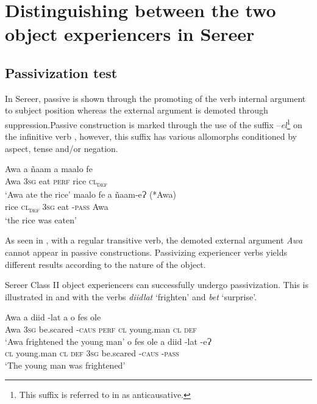 \documentclass[output=paper]{langscibook}
\begin{document}
\section{Distinguishing between the two object  experiencers in Sereer}
\label{sec:tamba:3}
\subsection{Passivization test}
\label{sec:tamba:3.1}

In Sereer, passive is shown through the promoting of the verb internal argument to subject position whereas the external argument is demoted through suppression.Passive construction is marked through the use of the suffix –\textit{el}\footnote{This suffix is referred to in \citet{FayeMous2006} as anticausative.} on the infinitive verb \citep{Faye1979,Renaudier2012,Faye2013}, however, this suffix has various allomorphs conditioned by aspect, tense and/or negation.

\ea \label{ex:tamba:8}
\ea \label{ex:tamba:8a}
\gll Awa   a       ñaam   a         maalo fe\\
Awa   \textsc{3sg}   eat      \textsc{perf}    rice     \textsc{cl\textsubscript{def}}\\
\glt `Awa ate the rice'
\ex \label{ex:tamba:8b}
\gll maalo fe     a      ñaam-eɁ       (*Awa)\\
rice    \textsc{cl\textsubscript{def}} \textsc{3sg}  eat     {}-\textsc{pass}   Awa\\
\glt `the rice was eaten'
\z
\z

As seen in , with a regular transitive verb, the demoted external argument \textit{Awa}  cannot appear in passive constructions. Passivizing experiencer verbs yields different results according to the nature of the object. 

Sereer Class II object experiencers can successfully undergo passivization. This is illustrated in  and  with the verbs \textit{diidlat} ‘frighten’ and \textit{bet} ‘surprise’. 

\ea \label{ex:tamba:9}
\ea \label{ex:tamba:9a}
\gll Awa  a      diid         {}-lat    a       o    fes            ole\\
Awa  \textsc{3sg} be.scared -\textsc{caus}  \textsc{perf}    \textsc{cl} young.man  \textsc{cl\textsubscript{} \textsc{def}}\\
\glt `Awa frightened the young man'
\ex \label{ex:tamba:9b}
\gll o  fes                ole     a      diid         {}-lat    {}-eɁ\\
\textsc{cl} young.man  \textsc{cl\textsubscript{} \textsc{def}}  \textsc{3sg}   be.scared -\textsc{caus}    \textsc{{}-pass}\\
\glt `The young man was frightened'
\z
\z
\end{document}
